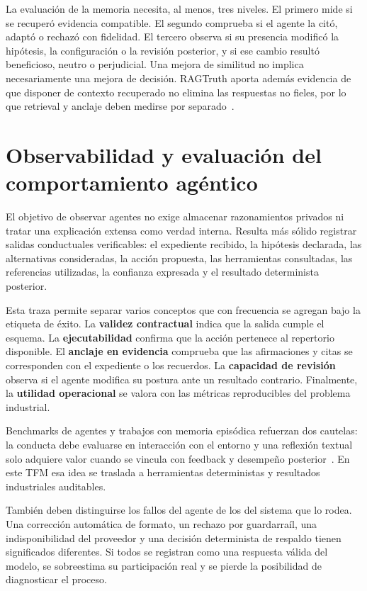 La evaluación de la memoria necesita, al menos, tres niveles. El primero mide
si se recuperó evidencia compatible. El segundo comprueba si el agente la citó,
adaptó o rechazó con fidelidad. El tercero observa si su presencia modificó la
hipótesis, la configuración o la revisión posterior, y si ese cambio resultó
beneficioso, neutro o perjudicial. Una mejora de similitud no implica
necesariamente una mejora de decisión. RAGTruth aporta además evidencia de que
disponer de contexto recuperado no elimina las respuestas no fieles, por lo que
retrieval y anclaje deben medirse por separado~\cite{niu2024_ragtruth}.

\section{Observabilidad y evaluación del comportamiento agéntico}

El objetivo de observar agentes no exige almacenar razonamientos privados ni
tratar una explicación extensa como verdad interna. Resulta más sólido registrar
salidas conductuales verificables: el expediente recibido, la hipótesis
declarada, las alternativas consideradas, la acción propuesta, las herramientas
consultadas, las referencias utilizadas, la confianza expresada y el resultado
determinista posterior.

Esta traza permite separar varios conceptos que con frecuencia se agregan bajo
la etiqueta de éxito. La \textbf{validez contractual} indica que la salida
cumple el esquema. La \textbf{ejecutabilidad} confirma que la acción pertenece
al repertorio disponible. El \textbf{anclaje en evidencia} comprueba que las
afirmaciones y citas se corresponden con el expediente o los recuerdos. La
\textbf{capacidad de revisión} observa si el agente modifica su postura ante un
resultado contrario. Finalmente, la \textbf{utilidad operacional} se valora con
las métricas reproducibles del problema industrial.

Benchmarks de agentes y trabajos con memoria episódica refuerzan dos cautelas:
la conducta debe evaluarse en interacción con el entorno y una reflexión
textual solo adquiere valor cuando se vincula con feedback y desempeño
posterior~\cite{liu2024_agentbench,shinn2023_reflexion}. En este TFM esa idea se
traslada a herramientas deterministas y resultados industriales auditables.

También deben distinguirse los fallos del agente de los del sistema que lo
rodea. Una corrección automática de formato, un rechazo por guardarraíl, una
indisponibilidad del proveedor y una decisión determinista de respaldo tienen
significados diferentes. Si todos se registran como una respuesta válida del
modelo, se sobreestima su participación real y se pierde la posibilidad de
diagnosticar el proceso.

